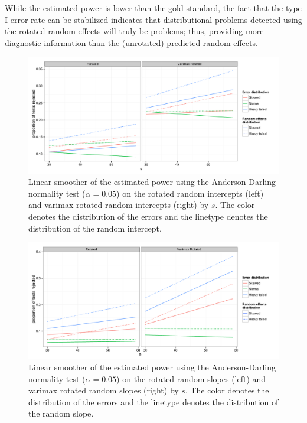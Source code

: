 \documentclass[12pt]{article} %
\begin{document}
While the estimated power is lower than the gold standard, the fact that the type I error rate can be stabilized indicates that distributional problems detected using the rotated random effects will truly be problems; thus, providing more diagnostic information than the (unrotated) predicted random effects.

\begin{figure}
	\centering
	\includegraphics[width=\textwidth]{ad_intercept_power.pdf}
	\caption{\label{fig:power-int} Linear smoother of the estimated power using the Anderson-Darling normality test ($\alpha = 0.05$) on the rotated random intercepts (left) and varimax rotated random intercepts (right) by $s$. The color denotes the distribution of the errors and the linetype denotes the distribution of the random intercept.}
\end{figure}

\begin{figure}
	\centering
	\includegraphics[width=\textwidth]{ad_slope_power.pdf}
	\caption{\label{fig:power-slope}Linear smoother of the estimated power using the Anderson-Darling normality test ($\alpha = 0.05$) on the rotated random slopes (left) and varimax rotated random slopes (right) by $s$. The color denotes the distribution of the errors and the linetype denotes the distribution of the random slope.}
\end{figure}
\end{document}
